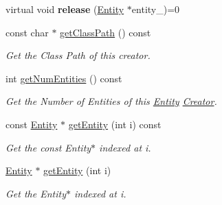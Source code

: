\begin{DoxyCompactItemize}
\item 
virtual void {\bfseries release} (\hyperlink{class_magnum_1_1_entity}{Entity} $\ast$entity\+\_\+)=0\hypertarget{class_magnum_1_1_entity_1_1_i_creator_a72261b418d549109146d70bd5fa750fa}{}\label{class_magnum_1_1_entity_1_1_i_creator_a72261b418d549109146d70bd5fa750fa}

\item 
const char $\ast$ \hyperlink{class_magnum_1_1_entity_1_1_i_creator_ad9a8b6d71f7c3ff236db456d8cfb7c7e}{get\+Class\+Path} () const 
\begin{DoxyCompactList}\small\item\em Get the Class Path of this creator. \end{DoxyCompactList}\item 
int \hyperlink{class_magnum_1_1_entity_1_1_i_creator_a57d32707da8ab3832d3b092b6e6fc85a}{get\+Num\+Entities} () const 
\begin{DoxyCompactList}\small\item\em Get the Number of Entities of this \hyperlink{class_magnum_1_1_entity}{Entity} \hyperlink{class_magnum_1_1_entity_1_1_creator}{Creator}. \end{DoxyCompactList}\item 
const \hyperlink{class_magnum_1_1_entity}{Entity} $\ast$ \hyperlink{class_magnum_1_1_entity_1_1_i_creator_a845f6633bcce0df7961820300315cc91}{get\+Entity} (int i) const 
\begin{DoxyCompactList}\small\item\em Get the const Entity$\ast$ indexed at i. \end{DoxyCompactList}\item 
\hyperlink{class_magnum_1_1_entity}{Entity} $\ast$ \hyperlink{class_magnum_1_1_entity_1_1_i_creator_ae3f55786e3ea5e8594dc9710af13d9f7}{get\+Entity} (int i)
\begin{DoxyCompactList}\small\item\em Get the Entity$\ast$ indexed at i. \end{DoxyCompactList}\end{DoxyCompactItemize}
